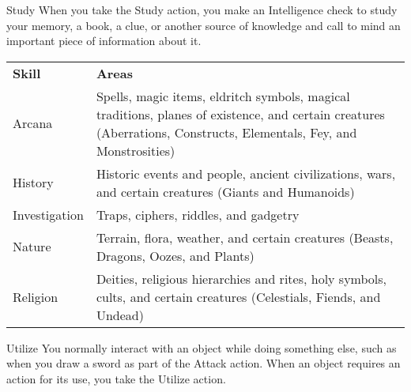 \begin{Card}[Action]{Study}
When you take the Study action, you make an Intelligence check to study your memory, a book, a clue, or another source of knowledge and call to mind an important piece of information about it.

\begin{tabular}{ll}
\textbf{Skill}  & \textbf{Areas} \\
Arcana & Spells, magic items, eldritch symbols, magical traditions, planes of existence, and certain creatures (Aberrations, Constructs, Elementals, Fey, and Monstrosities) \\
History         & Historic events and people, ancient civilizations, wars, and certain creatures (Giants and Humanoids) \\
Investigation   & Traps, ciphers, riddles, and gadgetry \\
Nature& Terrain, flora, weather, and certain creatures (Beasts, Dragons, Oozes, and Plants) \\
Religion        & Deities, religious hierarchies and rites, holy symbols, cults, and certain creatures (Celestials, Fiends, and Undead)
\end{tabular}
\end{Card}


\begin{Card}[Action]{Utilize}
You normally interact with an object while doing something else, such as when you draw a sword as part of the Attack action. When an object requires an action for its use, you take the Utilize action.
\end{Card}

